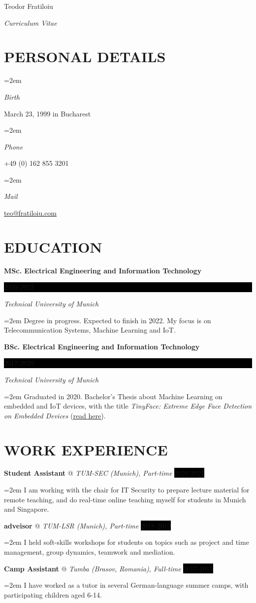 \documentclass[paper=a4,fontsize=11pt]{scrartcl}
\makeatletter
\newlength{\spacebox}
\newcommand{\sepspace}{\vspace*{1em}}		%
\newcommand{\MyName}[1]{ %
		\Huge \usefont{OT1}{phv}{b}{n} \hfill #1
		\par \normalsize \normalfont}
\newcommand{\MySlogan}[1]{ %
		\large \usefont{OT1}{phv}{m}{n}\hfill \textit{#1}
		\par \normalsize \normalfont}
\newcommand{\NewPart}[1]{\section*{\uppercase{#1}}}
\newcommand{\PersonalEntry}[2]{
		\noindent\hangindent=2em\hangafter=0 %
		\parbox{\spacebox}{        %
		\textit{#1}}		       %
		\hspace{1.5em} #2 \par}    %
\newcommand{\EducationEntry}[4]{
		\noindent \textbf{#1} \hfill      %
		\colorbox{Black}{%
			\parbox{6em}{%
			\hfill\color{White}#2}} \par  %
		\noindent \textit{#3} \par        %
		\noindent\hangindent=2em\hangafter=0 \small #4 %
		\normalsize \par}
\newcommand{\WorkEntry}[4]{				  %
		\noindent \textbf{#1} @ \textit{#3} \hfill      %
		\colorbox{Black}{\color{White}#2} \par  %
		\noindent\hangindent=2em\hangafter=0 \small #4 %
		\normalsize \par}
\makeatother
\begin{document}

\MyName{Teodor Fratiloiu}
\MySlogan{Curriculum Vitae}

\sepspace

\NewPart{Personal details}{}

\PersonalEntry{Birth}{March 23, 1999 in Bucharest}
\PersonalEntry{Phone}{+49 (0) 162 855 3201}
\PersonalEntry{Mail}{\url{teo@fratiloiu.com}}

\NewPart{Education}{}

\EducationEntry{MSc. Electrical Engineering and Information Technology}{2020-2022}{Technical University of Munich}{Degree in progress. Expected to finish in 2022. My focus is on Telecommunication Systems, Machine Learning and IoT.}
\sepspace

\EducationEntry{BSc. Electrical Engineering and Information Technology}{2017-2020}{Technical University of Munich}{Graduated in 2020. Bachelor's Thesis about Machine Learning on embedded and IoT devices, with the title \textit{TinyFace: Extreme Edge Face Detection on Embedded Devices} (\href{https://github.com/munober/thesis/blob/master/digital_edition.pdf}{\underline{read here}}).}

\NewPart{Work experience}{}

\WorkEntry{Student Assistant}{2020-2021}{TUM-SEC (Munich), Part-time}{I am working with the chair for IT Security to prepare lecture material for remote teaching, and do real-time online teaching myself for students in Munich and Singapore.}
\sepspace

\WorkEntry{adveisor}{2018-2019}{TUM-LSR (Munich), Part-time}{I held soft-skills workshops for students on topics such as project and time management, group dynamics, teamwork and mediation.}
\sepspace

\WorkEntry{Camp Assistant}{2017-2019}{Tumba (Brasov, Romania), Full-time}{ I have worked as a tutor in several German-language summer camps, with participating children aged 6-14.}
\sepspace
\end{document}
